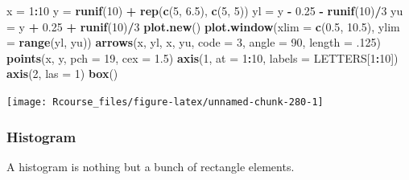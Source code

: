 \documentclass[]{book}
\newenvironment{Shaded}{\begin{snugshade}}{\end{snugshade}}
\newcommand{\DataTypeTok}[1]{\textcolor[rgb]{0.13,0.29,0.53}{#1}}
\newcommand{\DecValTok}[1]{\textcolor[rgb]{0.00,0.00,0.81}{#1}}
\newcommand{\FloatTok}[1]{\textcolor[rgb]{0.00,0.00,0.81}{#1}}
\newcommand{\KeywordTok}[1]{\textcolor[rgb]{0.13,0.29,0.53}{\textbf{#1}}}
\newcommand{\NormalTok}[1]{#1}
\newcommand{\OperatorTok}[1]{\textcolor[rgb]{0.81,0.36,0.00}{\textbf{#1}}}
\newcommand{\StringTok}[1]{\textcolor[rgb]{0.31,0.60,0.02}{#1}}
\theoremstyle{definition}
\theoremstyle{definition}
\theoremstyle{definition}
\theoremstyle{remark}
\begin{document}
\begin{Shaded}
\begin{Highlighting}[]
\NormalTok{x =}\StringTok{ }\DecValTok{1}\OperatorTok{:}\DecValTok{10}
\NormalTok{y =}\StringTok{ }\KeywordTok{runif}\NormalTok{(}\DecValTok{10}\NormalTok{) }\OperatorTok{+}\StringTok{ }\KeywordTok{rep}\NormalTok{(}\KeywordTok{c}\NormalTok{(}\DecValTok{5}\NormalTok{, }\FloatTok{6.5}\NormalTok{), }\KeywordTok{c}\NormalTok{(}\DecValTok{5}\NormalTok{, }\DecValTok{5}\NormalTok{))}
\NormalTok{yl =}\StringTok{ }\NormalTok{y }\OperatorTok{-}\StringTok{ }\FloatTok{0.25} \OperatorTok{-}\StringTok{ }\KeywordTok{runif}\NormalTok{(}\DecValTok{10}\NormalTok{)}\OperatorTok{/}\DecValTok{3}
\NormalTok{yu =}\StringTok{ }\NormalTok{y }\OperatorTok{+}\StringTok{ }\FloatTok{0.25} \OperatorTok{+}\StringTok{ }\KeywordTok{runif}\NormalTok{(}\DecValTok{10}\NormalTok{)}\OperatorTok{/}\DecValTok{3}
\KeywordTok{plot.new}\NormalTok{()}
\KeywordTok{plot.window}\NormalTok{(}\DataTypeTok{xlim =} \KeywordTok{c}\NormalTok{(}\FloatTok{0.5}\NormalTok{, }\FloatTok{10.5}\NormalTok{), }\DataTypeTok{ylim =} \KeywordTok{range}\NormalTok{(yl, yu))}
\KeywordTok{arrows}\NormalTok{(x, yl, x, yu, }\DataTypeTok{code =} \DecValTok{3}\NormalTok{, }\DataTypeTok{angle =} \DecValTok{90}\NormalTok{, }\DataTypeTok{length =} \FloatTok{.125}\NormalTok{)}
\KeywordTok{points}\NormalTok{(x, y, }\DataTypeTok{pch =} \DecValTok{19}\NormalTok{, }\DataTypeTok{cex =} \FloatTok{1.5}\NormalTok{)}
\KeywordTok{axis}\NormalTok{(}\DecValTok{1}\NormalTok{, }\DataTypeTok{at =} \DecValTok{1}\OperatorTok{:}\DecValTok{10}\NormalTok{, }\DataTypeTok{labels =}\NormalTok{ LETTERS[}\DecValTok{1}\OperatorTok{:}\DecValTok{10}\NormalTok{])}
\KeywordTok{axis}\NormalTok{(}\DecValTok{2}\NormalTok{, }\DataTypeTok{las =} \DecValTok{1}\NormalTok{)}
\KeywordTok{box}\NormalTok{()}
\end{Highlighting}
\end{Shaded}

\texttt{[image: Rcourse\_files/figure-latex/unnamed-chunk-280-1]}

\hypertarget{histogram}{%
\subsubsection{Histogram}\label{histogram}}

A histogram is nothing but a bunch of rectangle elements.
\end{document}
